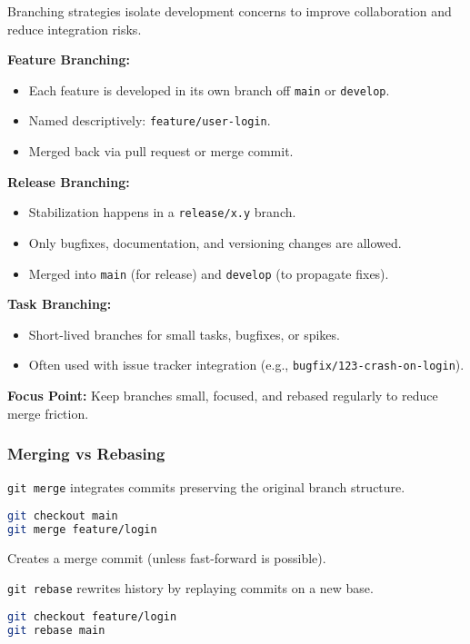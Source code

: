 \documentclass[a4paper,12pt]{article}
\begin{document}
Branching strategies isolate development concerns to improve collaboration and reduce integration risks.

\textbf{Feature Branching:}
\begin{itemize}
  \item Each feature is developed in its own branch off \texttt{main} or \texttt{develop}.
  \item Named descriptively: \texttt{feature/user-login}.
  \item Merged back via pull request or merge commit.
\end{itemize}

\textbf{Release Branching:}
\begin{itemize}
  \item Stabilization happens in a \texttt{release/x.y} branch.
  \item Only bugfixes, documentation, and versioning changes are allowed.
  \item Merged into \texttt{main} (for release) and \texttt{develop} (to propagate fixes).
\end{itemize}

\textbf{Task Branching:}
\begin{itemize}
  \item Short-lived branches for small tasks, bugfixes, or spikes.
  \item Often used with issue tracker integration (e.g., \texttt{bugfix/123-crash-on-login}).
\end{itemize}

\textbf{Focus Point:} Keep branches small, focused, and rebased regularly to reduce merge friction.

\subsubsection{Merging vs Rebasing}

\texttt{git merge} integrates commits preserving the original branch structure.

\begin{lstlisting}[language=bash]
git checkout main
git merge feature/login
\end{lstlisting}

Creates a merge commit (unless fast-forward is possible).

\texttt{git rebase} rewrites history by replaying commits on a new base.

\begin{lstlisting}[language=bash]
git checkout feature/login
git rebase main
\end{lstlisting}
\end{document}
